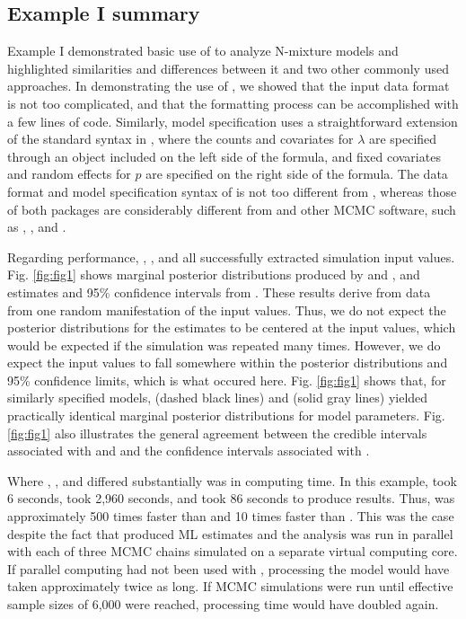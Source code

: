 \documentclass[codesnippet]{jss}
\begin{document}
\subsection[Example I summary]{Example I summary}
Example I demonstrated basic use of  to analyze N-mixture models and highlighted similarities and differences between it and two other commonly used approaches. In demonstrating the use of , we showed that the input data format is not too complicated, and that the formatting process can be accomplished with a few lines of code. Similarly, model specification uses a straightforward extension of the standard syntax in , where the counts and covariates for $\lambda$ are specified through an  object included on the left side of the formula, and fixed covariates and random effects for $p$ are specified on the right side of the formula. The data format and model specification syntax of  is not too different from , whereas those of both packages are considerably different from  and other MCMC software, such as , , and .

Regarding performance, , , and  all successfully extracted simulation input values. Fig. \ref{fig:fig1} shows marginal posterior distributions produced by  and , and estimates and 95\% confidence intervals from . These results derive from data from one random manifestation of the input values. Thus, we do not expect the posterior distributions for the estimates to be centered at the input values, which would be expected if the simulation was repeated many times. However, we do expect the input values to fall somewhere within the posterior distributions and 95\% confidence limits, which is what occured here. Fig. \ref{fig:fig1} shows that, for similarly specified models,  (dashed black lines) and  (solid gray lines) yielded practically identical marginal posterior distributions for model parameters. Fig. \ref{fig:fig1} also illustrates the general agreement between the credible intervals associated with  and  and the confidence intervals associated with .

Where , , and  differed 
substantially was in computing time. In this example,  took 6 
seconds,  took 2,960 seconds, and  took 86 
seconds to produce results. Thus,  was approximately 500 times 
faster than  and 10 times faster than . This 
was the case despite the fact that  produced ML estimates and 
the  analysis was run in parallel with each of three MCMC 
chains simulated on a separate virtual computing core. If parallel computing 
had not been used with , processing the  model 
would have taken approximately twice as long. If MCMC simulations were run 
until effective sample sizes of 6,000 were reached, processing time would 
have doubled again.
\end{document}
